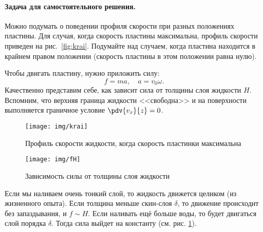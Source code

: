 \paragraph{Задача для самостоятельного решения.} Можно подумать о поведении профиля скорости при разных положениях пластины.
Для случая, когда скорость пластины максимальна, профиль скорости приведен на рис.~\ref{fig:krai}. Подумайте над случаем, когда пластина находится в крайнем правом положении (скорость пластины в этом положении равна нулю).

Чтобы двигать пластину, нужно приложить силу:
\begin{equation}
    f=ma, \quad a=v_0 \omega.
\end{equation}
Качественно представим себе, как зависит сила от толщины слоя жидкости $H$. Вспомним, что верхняя граница жидкости <<свободна>> и на поверхности выполняется граничное условие $\pdv{v_x}{z}=0$.

\begin{figure}[H]
    \begin{minipage}[h]{0.48\linewidth}
		    \centering
		    \texttt{[image: img/krai]}
		    \caption{Профиль скорости жидкости, когда скорость
		пластинки максимальна}
		    \label{fig:krai}
    \end{minipage}
    \hfill
    \begin{minipage}[h]{0.48\linewidth}
	    \centering
	    \vspace{14pt}
	    \texttt{[image: img/fH]}
	    \caption{Зависимость силы от толщины слоя жидкости}
	    \label{fig:fH}
    \end{minipage}
\end{figure}



Если мы наливаем очень тонкий слой, то жидкость движется целиком (из жизненного опыта). Если толщина меньше скин-слоя $\delta$, то движение происходит без запаздывания, и $f \sim H$. Если наливать ещё больше воды, то будет двигаться слой порядка $\delta$. Тогда сила выйдет на константу (см. рис. \ref{fig:fH}).

